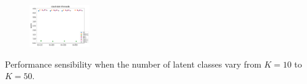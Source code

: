 \begin{subfigure}                                                           
         \centering                                                         
      \includegraphics[width=0.23\textwidth]{fig2/slashdot_wsim_evo2__}
\end{subfigure}                                                             
\caption{Performance sensibility when the number of latent classes vary from $K=10$ to $K=50$.}
